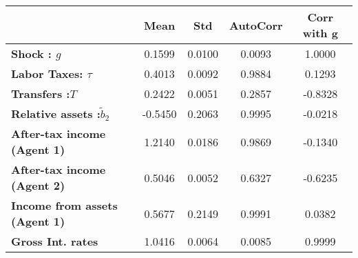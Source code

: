 \begin{tiny}\begin{tabular}{|l|c|c|c|c|}
\hline
&\textbf{Mean}&\textbf{Std}&\textbf{AutoCorr}&\textbf{Corr with g}\\\hline
\textbf{Shock : $g$}&0.1599&0.0100&0.0093&1.0000\\\hline
\textbf{Labor Taxes: $\tau$}&0.4013&0.0092&0.9884&0.1293\\\hline
\textbf{Transfers :$T$}&0.2422&0.0051&0.2857&-0.8328\\\hline
\textbf{Relative assets  :$\tilde{b}_2$}&-0.5450&0.2063&0.9995&-0.0218\\\hline
\textbf{After-tax income (Agent 1)}&1.2140&0.0186&0.9869&-0.1340\\\hline
\textbf{After-tax income (Agent 2)}&0.5046&0.0052&0.6327&-0.6235\\\hline
\textbf{Income from assets (Agent 1)}&0.5677&0.2149&0.9991&0.0382\\\hline
\textbf{Gross Int. rates}&1.0416&0.0064&0.0085&0.9999\\\hline
\end{tabular}
\end{tiny}